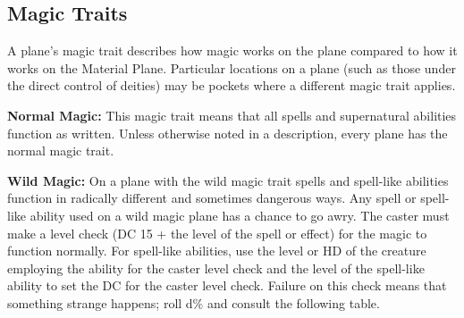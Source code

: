 \subsection{Magic Traits}
A plane's magic trait describes how magic works on the plane compared to how it works on the Material Plane. Particular locations on a plane (such as those under the direct control of deities) may be pockets where a different magic trait applies.

\textbf{Normal Magic:} This magic trait means that all spells and supernatural abilities function as written. Unless otherwise noted in a description, every plane has the normal magic trait.

\textbf{Wild Magic:} On a plane with the wild magic trait spells and spell-like abilities function in radically different and sometimes dangerous ways. Any spell or spell-like ability used on a wild magic plane has a chance to go awry. The caster must make a level check (DC 15 + the level of the spell or effect) for the magic to function normally. For spell-like abilities, use the level or HD of the creature employing the ability for the caster level check and the level of the spell-like ability to set the DC for the caster level check. Failure on this check means that something strange happens; roll d\% and consult the following table.

